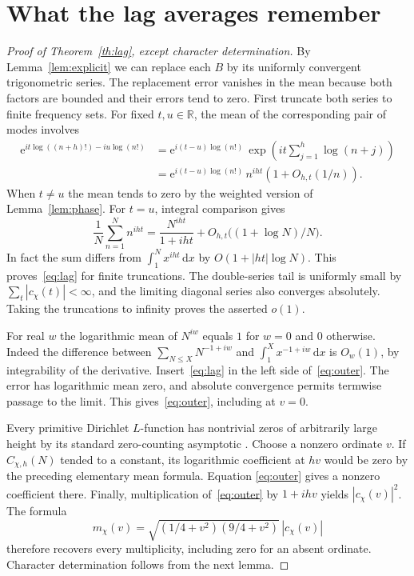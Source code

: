 \documentclass[11pt]{article}
\newcommand{\R}{\mathbb R}
\newcommand{\e}{\mathrm e}
\newcommand{\dd}{\mathrm d}
\begin{document}
\section{What the lag averages remember}
\begin{proof}[Proof of Theorem~\ref{th:lag}, except character determination]
By Lemma~\ref{lem:explicit} we can replace each $B$ by its uniformly
convergent trigonometric series. The replacement error vanishes in the
mean because both factors are bounded and their errors tend to zero.
First truncate both series to finite frequency sets. For fixed
$t,u\in\R$, the mean of the corresponding pair of modes involves
\begin{align*}
 \e^{it\log((n+h)!)-iu\log(n!)}
 &=\e^{i(t-u)\log(n!)}\,
   \exp\!\left(it\sum_{j=1}^h\log(n+j)\right)\\
 &=\e^{i(t-u)\log(n!)}\,n^{iht}(1+O_{h,t}(1/n)).
\end{align*}
When $t\ne u$ the mean tends to zero by the weighted version of
Lemma~\ref{lem:phase}. For $t=u$, integral comparison gives
\[
 \frac1N\sum_{n=1}^N n^{iht}=\frac{N^{iht}}{1+iht}
 + O_{h,t}\big((1+\log N)/N\big).
\]
In fact the sum differs from $\int_1^N x^{iht}\,\dd x$ by
$O(1+|ht|\log N)$. This proves~\eqref{eq:lag} for finite
truncations. The double-series tail is uniformly small by
$\sum_t |c_\chi(t)|<\infty$, and the limiting diagonal series
also converges absolutely. Taking the truncations to infinity proves
the asserted $o(1)$.

For real $w$ the logarithmic mean of $N^{iw}$ equals $1$ for $w=0$
and $0$ otherwise. Indeed the difference between
$\sum_{N\le X}N^{-1+iw}$ and $\int_1^X x^{-1+iw}\,\dd x$ is
$O_w(1)$, by integrability of the derivative. Insert~\eqref{eq:lag}
in the left side of~\eqref{eq:outer}. The error has logarithmic mean
zero, and absolute convergence permits termwise passage to the limit.
This gives~\eqref{eq:outer}, including at $v=0$.

Every primitive Dirichlet $L$-function has nontrivial zeros of
arbitrarily large height by its standard zero-counting asymptotic
\cite{bennett,davenport}. Choose a nonzero ordinate $v$. If
$C_{\chi,h}(N)$ tended to a constant, its logarithmic coefficient at
$hv$ would be zero by the preceding elementary mean formula. Equation
\eqref{eq:outer} gives a nonzero coefficient there. Finally,
multiplication of~\eqref{eq:outer} by $1+ihv$ yields $|c_\chi(v)|^2$.
The formula
\[
 m_\chi(v)=\sqrt{(1/4+v^2)(9/4+v^2)}\,|c_\chi(v)|
\]
therefore recovers every multiplicity, including zero for an absent
ordinate. Character determination follows from the next lemma.
\end{proof}
\end{document}
